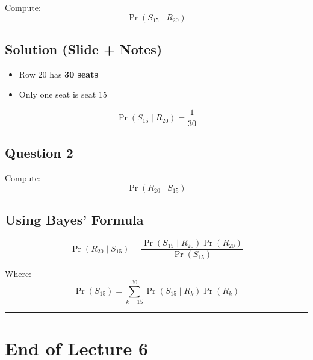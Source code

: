 \documentclass[11pt]{article}
\begin{document}
Compute:
\[
\Pr(S_{15} \mid R_{20})
\]

\subsection*{Solution (Slide + Notes)}

\begin{itemize}
    \item Row 20 has \textbf{30 seats}
    \item Only one seat is seat 15
\end{itemize}

\[
\Pr(S_{15} \mid R_{20}) = \frac{1}{30}
\]

\subsection*{Question 2}

Compute:
\[
\Pr(R_{20} \mid S_{15})
\]

\subsection*{Using Bayes’ Formula}

\[
\Pr(R_{20} \mid S_{15})
=
\frac{\Pr(S_{15} \mid R_{20}) \Pr(R_{20})}
{\Pr(S_{15})}
\]

Where:
\[
\Pr(S_{15}) = \sum_{k=15}^{30} \Pr(S_{15} \mid R_k)\Pr(R_k)
\]


\hrule
\vspace{1em}

\section*{End of Lecture 6}
\end{document}
